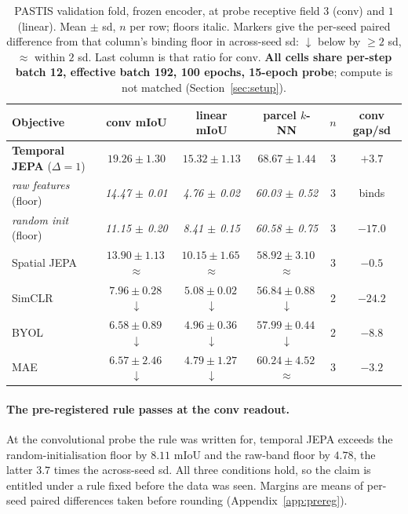 \documentclass{article}
\begin{document}
\begin{table}[t]
  \caption{PASTIS validation fold, frozen encoder, at probe receptive field $3$ (conv) and $1$
  (linear). Mean $\pm$ sd, $n$ per row; floors italic. Markers give the per-seed paired difference
  from that column's binding floor in across-seed sd: $\downarrow$ below by ${\geq}2$ sd, $\approx$
  within $2$ sd. Last column is that ratio for conv. \textbf{All cells share per-step batch 12,
  effective batch 192, 100 epochs, 15-epoch probe}; compute is not matched (Section~\ref{sec:setup}).}
  \label{tab:main}
  \centering
  \scriptsize
  \setlength{\tabcolsep}{4.5pt}
  \begin{tabular}{lccccc}
    \toprule
    Objective & conv mIoU & linear mIoU & parcel $k$-NN & $n$ & conv gap/sd \\
    \midrule
    \textbf{Temporal JEPA} ($\Delta{=}1$) & $\mathbf{19.26 \pm 1.30}$ & $\mathbf{15.32 \pm 1.13}$ & $\mathbf{68.67 \pm 1.44}$ & 3 & $+3.7$ \\
    \midrule
    \emph{raw features} (floor) & \emph{14.47 $\pm$ 0.01} & \emph{4.76 $\pm$ 0.02} & \emph{60.03 $\pm$ 0.52} & 3 & binds \\
    \emph{random init} (floor)  & \emph{11.15 $\pm$ 0.20} & \emph{8.41 $\pm$ 0.15} & \emph{60.58 $\pm$ 0.75} & 3 & $-17.0$ \\
    \midrule
    Spatial JEPA & $13.90 \pm 1.13$\,$\approx$ & $10.15 \pm 1.65$\,$\approx$ & $58.92 \pm 3.10$\,$\approx$ & 3 & $-0.5$ \\
    SimCLR & $7.96 \pm 0.28$\,$\downarrow$ & $5.08 \pm 0.02$\,$\downarrow$ & $56.84 \pm 0.88$\,$\downarrow$ & 2 & $-24.2$ \\
    BYOL   & $6.58 \pm 0.89$\,$\downarrow$ & $4.96 \pm 0.36$\,$\downarrow$ & $57.99 \pm 0.44$\,$\downarrow$ & 2 & $-8.8$ \\
    MAE    & $6.57 \pm 2.46$\,$\downarrow$ & $4.79 \pm 1.27$\,$\downarrow$ & $60.24 \pm 4.52$\,$\approx$ & 3 & $-3.2$ \\
    \bottomrule
  \end{tabular}
\end{table}

\paragraph{The pre-registered rule passes at the conv readout.} At the convolutional probe the rule
was written for, temporal JEPA exceeds the random-initialisation floor by $8.11$ mIoU and the
raw-band floor by $4.78$, the latter $3.7$ times the across-seed sd. All three conditions hold, so
the claim is entitled under a rule fixed before the data was seen. Margins are means of per-seed
paired differences taken before rounding (Appendix~\ref{app:prereg}).
\end{document}
